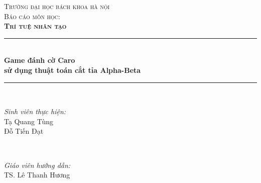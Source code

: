\documentclass[12pt]{report}
\begin{document}
\begin{titlepage}

\newcommand{\HRule}{\rule{\linewidth}{0.5mm}} %

\center %
 

\textsc{\Large Trường đại học bách khoa hà nội}\\[1cm] %
\textsc{\large Báo cáo môn học:} \\[0.2cm]
\textsc{\LARGE\bfseries Trí tuệ nhân tạo}\\[1cm] %


\HRule \\[0.4cm]
{\LARGE \bfseries Game đánh cờ Caro}\\[0.03cm] %
{\LARGE \bfseries sử dụng thuật toán cắt tỉa Alpha-Beta}\\[0.03cm] %
\HRule \\[1.5cm]

 

\begin{minipage}{0.4\textwidth}
\begin{flushleft} \large
\emph{Sinh viên thực hiện:}\\
Tạ Quang Tùng \\
Đỗ Tiến Đạt
\end{flushleft}
\end{minipage}
~
\begin{minipage}{0.4\textwidth}
\begin{flushright} \large
\emph{Giáo viên hướng dẫn:} \\
TS. Lê Thanh Hương
\end{flushright}
\end{minipage}\\[2cm]


\end{titlepage}
\end{document}
